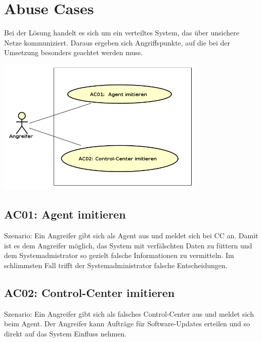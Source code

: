 \section{Abuse Cases}

Bei der Lösung handelt es sich um ein verteiltes System, das über unsichere Netze kommuniziert. Daraus ergeben sich Angriffspunkte, auf die bei der Umsetzung besonders geachtet werden muss.

\begin{center}
    \includegraphics[width=0.75\textwidth]{files/AbuseCases_small}
\end{center}

\xxx[caption!]

\subsection*{AC01: Agent imitieren}
\label{auc:01}

Szenario: Ein Angreifer gibt sich als Agent aus und meldet sich bei CC an. Damit ist es dem Angreifer möglich, das System mit verfälschten Daten zu füttern und dem Systemadmistrator so gezielt falsche Informationen zu vermitteln. Im schlimmsten Fall trifft der Systemadministrator falsche Entscheidungen.

\subsection*{AC02: Control-Center imitieren}
\label{auc:02}

Szenario: Ein Angreifer gibt sich als falsches Control-Center aus und meldet sich beim Agent. Der Angreifer kann Aufträge für Software-Updates erteilen und so direkt auf das System Einfluss nehmen.